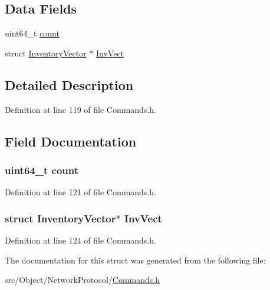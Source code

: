 \subsection*{Data Fields}
\begin{DoxyCompactItemize}
\item 
uint64\_\-t \hyperlink{struct_cmd_get_data_afcc68e9eec57ce069fcdc37815837d6d}{count}
\item 
struct \hyperlink{struct_inventory_vector}{InventoryVector} $\ast$ \hyperlink{struct_cmd_get_data_aa0131206f52d276b9c712b34aaff1592}{InvVect}
\end{DoxyCompactItemize}


\subsection{Detailed Description}


Definition at line 119 of file Commands.h.



\subsection{Field Documentation}
\hypertarget{struct_cmd_get_data_afcc68e9eec57ce069fcdc37815837d6d}{
\subsubsection[{count}]{\setlength{\rightskip}{0pt plus 5cm}uint64\_\-t {\bf count}}}
\label{struct_cmd_get_data_afcc68e9eec57ce069fcdc37815837d6d}


Definition at line 121 of file Commands.h.

\hypertarget{struct_cmd_get_data_aa0131206f52d276b9c712b34aaff1592}{
\subsubsection[{InvVect}]{\setlength{\rightskip}{0pt plus 5cm}struct {\bf InventoryVector}$\ast$ {\bf InvVect}}}
\label{struct_cmd_get_data_aa0131206f52d276b9c712b34aaff1592}


Definition at line 124 of file Commands.h.



The documentation for this struct was generated from the following file:\begin{DoxyCompactItemize}
\item 
src/Object/NetworkProtocol/\hyperlink{_commands_8h}{Commands.h}\end{DoxyCompactItemize}
